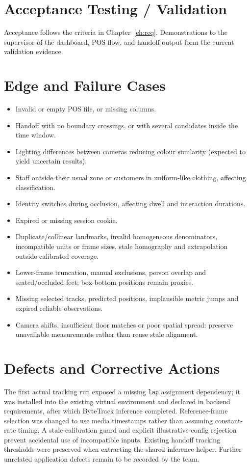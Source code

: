 \section{Acceptance Testing / Validation}
Acceptance follows the criteria in Chapter~\ref{ch:req}. Demonstrations to the supervisor of the dashboard, POS flow, and handoff output form the current validation evidence. 


\section{Edge and Failure Cases}
\begin{itemize}
\item Invalid or empty POS file, or missing columns.
\item Handoff with no boundary crossings, or with several candidates inside the time window.
\item Lighting differences between cameras reducing colour similarity (expected to yield uncertain results).
\item Staff outside their usual zone or customers in uniform-like clothing, affecting classification.
\item Identity switches during occlusion, affecting dwell and interaction durations.
\item Expired or missing session cookie.
\item Duplicate/collinear landmarks, invalid homogeneous denominators, incompatible units or frame sizes, stale homography and extrapolation outside calibrated coverage.
\item Lower-frame truncation, manual exclusions, person overlap and seated/occluded feet; box-bottom positions remain proxies.
\item Missing selected tracks, predicted positions, implausible metric jumps and expired reliable observations.
\item Camera shifts, insufficient floor matches or poor spatial spread: preserve unavailable measurements rather than reuse stale alignment.
\end{itemize}

\section{Defects and Corrective Actions}
The first actual tracking run exposed a missing \texttt{lap} assignment dependency; it was installed into the existing virtual environment and declared in backend requirements, after which ByteTrack inference completed. Reference-frame selection was changed to use media timestamps rather than assuming constant-rate timing. A stale-calibration guard and explicit illustrative-config rejection prevent accidental use of incompatible inputs. Existing handoff tracking thresholds were preserved when extracting the shared inference helper. Further unrelated application defects remain to be recorded by the team.

